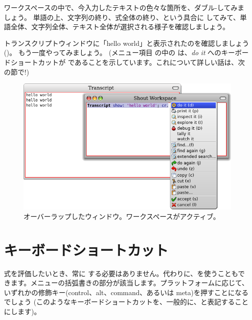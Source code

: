 \documentclass[a4paper,10pt,twoside]{book}
\begin{document}
ワークスペースの中で、今入力したテキストの色々な箇所を、ダブル-\click してみましょう。
単語の上、文字列の終り、式全体の終り、という具合に \click してみて、単語全体、文字列全体、テキスト全体が選択される様子を確認しましょう。

トランスクリプトウィンドウに「hello world」と表示されたのを確認しましょう
()。
もう一度やってみましょう。
(メニュー項目  の中の  は、\emph{do it} へのキーボードショートカットが  であることを示しています。これについて詳しい話は、次の節で!)

\begin{figure}[htb]
\centerline {\includegraphics[width=\textwidth]{HelloWorld}}
\caption{オーバーラップしたウィンドウ。ワークスペースがアクティブ。}
\end{figure}

\section{キーボードショートカット}

式を評価したいとき、常に \actclick する必要はありません。代わりに、を使うこともできます。メニューの括弧書きの部分が該当します。プラットフォームに応じて、いずれかの修飾キー(control、alt、command、あるいは meta)を押すことになるでしょう
(このようなキーボードショートカットを、一般的に、と表記することにします)。

\end{document}
